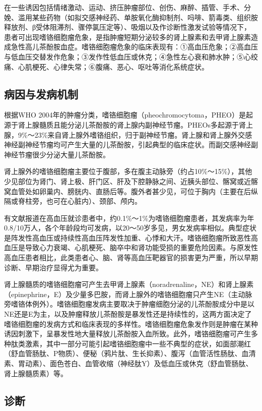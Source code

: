 在一些诱因包括情绪激动、运动、挤压肿瘤部位、创伤、麻醉、插管、手术、分娩、滥用某些药物（如拟交感神经药、单胺氧化酶抑制剂、吗啡、箭毒类、组织胺释放剂、β受体阻滞剂、骤停氯压定等）、吸烟以及作诊断性激发试验等情况下，患者可出现嗜铬细胞瘤危象，是指肿瘤短期分泌较多的肾上腺素和去甲肾上腺素造成急性高儿茶酚胺血症。嗜铬细胞瘤危象的临床表现有：①高血压危象；②高血压与低血压交替发作危象；③发作性低血压或休克；④急性左心衰和肺水肿；⑤心绞痛、心肌梗死、心律失常；⑥腹痛、恶心、呕吐等消化系统症状。

\subsection{病因与发病机制}

根据WHO
2004年的肿瘤分类，嗜铬细胞瘤（pheochromocytoma，PHEO）是起源于肾上腺髓质且能分泌儿茶酚胺的肾上腺内副神经节瘤。PHEOs多起源于肾上腺，9\%～23\%来自肾上腺外嗜铬组织，归于副神经节瘤。肾上腺和肾上腺外交感神经副神经节瘤均可产生大量的儿茶酚胺，引起典型的临床症状。而副交感神经副神经节瘤很少分泌大量儿茶酚胺。

肾上腺外的嗜铬细胞瘤主要位于腹部，多在腹主动脉旁（约占10\%～15\%），其他少见部位为肾门、肾上极、肝门区、肝及下腔静脉之间、近胰头部位、髂窝或近髂窝血管处如卵巢内、膀胱内、直肠后等。腹外者甚少见，可位于胸内（主要在后纵隔或脊柱旁，也可在心脏内）、颈部、颅内。

有文献报道在高血压就诊患者中，约0.1\%～1\%为嗜铬细胞瘤患者，其发病率为年0.8/10万人，各个年龄段均可发病，以20～50岁多见，男女发病率相似。典型症状是阵发性高血压或持续性高血压阵发性加重、心悸和大汗。嗜铬细胞瘤所致恶性高血压是导致心力衰竭、心肌梗死、脑卒中和肾功能受损的重要危险因素。与原发性高血压患者相比，此类患者心、脑、肾等高血压靶器官的损害更为严重，所以早期诊断、早期治疗显得尤为重要。

肾上腺髓质的嗜铬细胞瘤可产生去甲肾上腺素（noradrenaline，NE）和肾上腺素（epinephrine，E）及少量多巴胺，而肾上腺外的嗜铬细胞瘤只产生NE（主动脉旁嗜铬体例外）。嗜铬细胞瘤发病主要取决于肿瘤细胞分泌的儿茶酚胺成分中是以NE还是E为主，以及肿瘤释放儿茶酚胺是暴发性还是持续性的，这两方面决定了嗜铬细胞瘤的发病方式和临床表现的多样性。嗜铬细胞瘤危象发作则是肿瘤在某种诱因刺激下，呈暴发性地大量释放儿茶酚胺入血所致。此外，嗜铬细胞瘤可产生多种肽类激素，其中一部分可能引起嗜铬细胞瘤中一些不典型的症状，如面部潮红（舒血管肠肽、P物质）、便秘（鸦片肽、生长抑素）、腹泻（血管活性肠肽、血清素、胃动素）、面色苍白、血管收缩（神经肽Y）及低血压或休克（舒血管肠肽、肾上腺髓质素）等。

\subsection{诊断}

